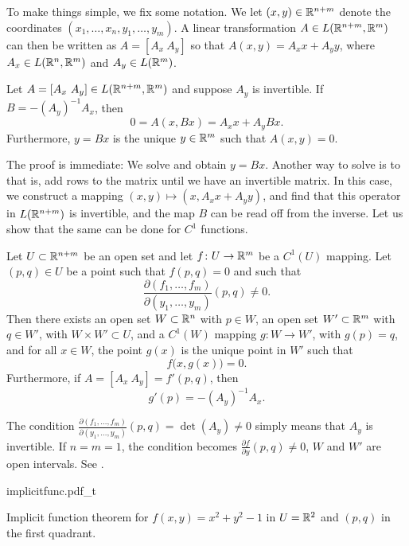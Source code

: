To make things simple, we fix some notation.  We let $(x,y) \in
{\mathbb{R}}^{n+m}$ denote the coordinates $(x_1,\ldots,x_n,y_1,\ldots,y_m)$.  A
linear transformation $A \in L({\mathbb{R}}^{n+m},{\mathbb{R}}^m)$ can then 
be written as
$A = [ A_x ~ A_y ]$ so that $A(x,y) = A_x x + A_y y$,
where $A_x \in L({\mathbb{R}}^n,{\mathbb{R}}^m)$ and
$A_y \in L({\mathbb{R}}^m)$.

\begin{prop}
Let $A = [A_x~A_y] \in L({\mathbb{R}}^{n+m},{\mathbb{R}}^m)$ and suppose 
$A_y$ is invertible.  If $B = - {(A_y)}^{-1} A_x$, then
\begin{equation*}
0 = A ( x, Bx) = A_x x + A_y Bx .
\end{equation*}
Furthermore, $y=Bx$ is the unique $y \in {\mathbb{R}}^m$ such that $A(x,y) = 0$.
\end{prop}

The proof is immediate: We solve and obtain $y = Bx$.
Another way to solve is to  that is, add
rows to the matrix until we have an invertible matrix.  In this case,
we construct a mapping $(x,y) \mapsto (x,A_x x + A_y y)$, and
find that this operator in $L({\mathbb{R}}^{n+m})$ is invertible, and the map $B$
can be read off from the inverse.
Let us show that the same can be done for $C^1$ functions.

\begin{thm}
\label{thm:implicit}
Let $U \subset {\mathbb{R}}^{n+m}$ be an open set and let $f \colon U \to {\mathbb{R}}^m$
be a $C^1(U)$ mapping.  Let $(p,q) \in U$ be a point such that
$f(p,q) = 0$ and such that
\begin{equation*}
\frac{\partial(f_1,\ldots,f_m)}{\partial(y_1,\ldots,y_m)} (p,q)  \neq 0 .
\end{equation*}
Then there exists an
open set $W \subset {\mathbb{R}}^n$ with $p \in W$,
an open set $W' \subset {\mathbb{R}}^m$ with $q \in W'$,
with $W \times W' \subset U$,
and
a $C^1(W)$ mapping $g \colon W \to W'$, with $g(p) = q$, and
for all $x \in W$, the point $g(x)$ is the unique point in $W'$
such that 
\begin{equation*}
f\bigl(x,g(x)\bigr) = 0 .
\end{equation*}
Furthermore, if $A = [ A_x ~ A_y ] = f'(p,q)$, then
\begin{equation*}
g'(p) = -{(A_y)}^{-1}A_x .
\end{equation*}
\end{thm}

The condition
$\frac{\partial(f_1,\ldots,f_m)}{\partial(y_1,\ldots,y_m)} (p,q) =
\det(A_y)  \neq 0$
simply means that $A_y$ is invertible.  If $n=m=1$, the condition 
becomes $\frac{\partial f}{\partial y}(p,q) \not= 0$, $W$ and $W'$ are 
open intervals.  See .
\begin{myfigureht}
{implicitfunc.pdf_t}
\caption{Implicit function theorem for $f(x,y) = x^2+y^2-1$ in $U={\mathbb{R}}^2$ and
$(p,q)$ in the first quadrant.\label{fig:implicitfunc}}
\end{myfigureht}

